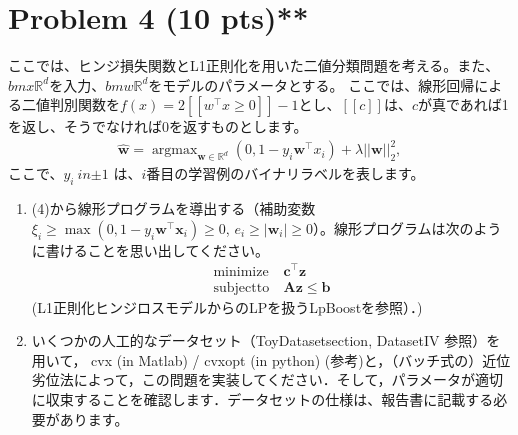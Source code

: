 \documentclass{jsarticle}
\DeclareMathOperator*{\argmax}{argmax}
\begin{document}
\section*{Problem 4 (10 pts)**}
ここでは、ヒンジ損失関数とL1正則化を用いた二値分類問題を考える。また、$bm x \mathbb R^d$を入力、$bm w \mathbb R^d$をモデルのパラメータとする。
ここでは、線形回帰による二値判別関数を$f(x) = 2[\![w^\top x \ge 0]\!] − 1$とし、$[\![c]\!]$は、$c$が真であれば1を返し、そうでなければ0を返すものとします。
\begin{align}
  \hat{\bm w} = \argmax_{\bm w\in \mathbb R^d}(0, 1 − y_i\bm w^\top x_i) + \lambda||\bm w||_2^2,
\end{align}
ここで、$y_i \ in {\pm1}$ は、$i$番目の学習例のバイナリラベルを表します。
\begin{enumerate}
  \item (4)から線形プログラムを導出する（補助変数 $\xi_i \ge \max(0, 1 - y_i\bm w^\top \bm x_i) \ge 0$, $e_i \ge |\bm w_i| \ge 0$）。線形プログラムは次のように書けることを思い出してください。
  \begin{align*}
  \mathrm{minimize}&\ \bm c^\top \bm z \\
  \mathrm{subject to}&\ \bm A\bm z \le \bm b
  \end{align*}
  (L1正則化ヒンジロスモデルからのLPを扱うLpBoostを参照）．)
  \item いくつかの人工的なデータセット（ToyDatasetsection, DatasetIV 参照）を用いて， cvx (in Matlab) / cvxopt (in python) (参考)と，（バッチ式の）近位劣位法によって，この問題を実装してください．そして，パラメータが適切に収束することを確認します．データセットの仕様は、報告書に記載する必要があります。
\end{enumerate}
\end{document}
